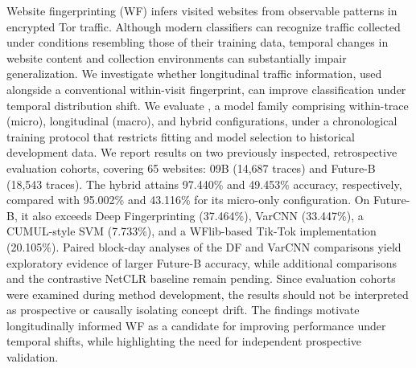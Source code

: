 Website fingerprinting (WF) infers visited websites from observable patterns in encrypted Tor traffic. Although modern classifiers can recognize traffic collected under conditions resembling those of their training data, temporal changes in website content and collection environments can substantially impair generalization. We investigate whether longitudinal traffic information, used alongside a conventional within-visit fingerprint, can improve classification under temporal distribution shift. We evaluate \LTD{}, a model family comprising within-trace (micro), longitudinal (macro), and hybrid configurations, under a chronological training protocol that restricts fitting and model selection to historical development data. We report results on two previously inspected, retrospective evaluation cohorts, covering 65 websites: 09B (14,687 traces) and Future-B (18,543 traces). The hybrid attains 97.440\% and 49.453\% accuracy, respectively, compared with 95.002\% and 43.116\% for its micro-only configuration. On Future-B, it also exceeds Deep Fingerprinting (37.464\%), VarCNN (33.447\%), a CUMUL-style SVM (7.733\%), and a WFlib-based Tik-Tok implementation (20.105\%). Paired block-day analyses of the DF and VarCNN comparisons yield exploratory evidence of larger Future-B accuracy, while additional comparisons and the contrastive NetCLR baseline remain pending. Since evaluation cohorts were examined during method development, the results should not be interpreted as prospective or causally isolating concept drift. The findings motivate longitudinally informed WF as a candidate for improving performance under temporal shifts, while highlighting the need for independent prospective validation.
